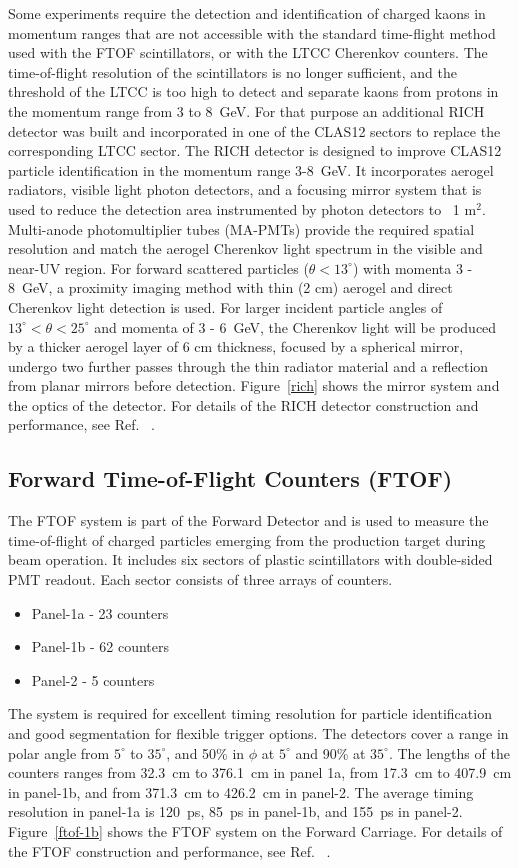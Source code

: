 \documentclass[final,3p,twocolumn]{elsarticle}
\begin{document}
Some experiments require the detection and identification of charged kaons in momentum ranges that are not 
accessible with the standard time-flight method used with the FTOF scintillators, or with the LTCC Cherenkov counters.
The time-of-flight resolution of the scintillators is no longer sufficient, and the threshold of the LTCC is too high 
to detect and separate kaons from protons in the momentum range from 3 to 8~GeV. For that purpose an additional
RICH detector was built and incorporated in one of the CLAS12 sectors to replace the corresponding LTCC sector. 
The RICH detector is designed to improve CLAS12 particle identification in the momentum range 3-8~GeV. It incorporates 
aerogel radiators, visible light photon detectors, and a focusing mirror system that is used to reduce the detection 
area instrumented by photon detectors to ~1 m$^2$.  Multi-anode photomultiplier tubes (MA-PMTs) provide the required 
spatial resolution and match the aerogel Cherenkov light spectrum in the visible and near-UV region.
For forward scattered particles ($\theta < 13^\circ$) with momenta 3 - 8~GeV, a proximity imaging method with thin (2 cm) 
aerogel and direct Cherenkov light detection is used. For larger incident particle angles of $13^\circ < \theta < 25^\circ$ and 
momenta of 3 - 6~GeV, the Cherenkov light will be produced by a thicker aerogel layer of 6 cm thickness, focused by a 
spherical mirror, undergo two further passes through the thin radiator material and a reflection from planar mirrors before 
detection. Figure~\ref{rich} shows the mirror system and the optics of the detector. For details of the RICH detector
construction and performance, see Ref. ~\cite{RICH}.

\subsection{Forward Time-of-Flight Counters (FTOF)}
\label{ftof}

The FTOF system is part of the Forward Detector and is used to measure the time-of-flight of charged particles 
emerging from the production target during beam operation. It includes six sectors of plastic scintillators with 
double-sided PMT readout. Each sector consists of three arrays of counters. 
\begin{itemize}
\item Panel-1a - 23 counters 
\item Panel-1b - 62 counters
\item Panel-2 - 5 counters 
\end{itemize}
The system is required for excellent timing resolution for particle identification and good segmentation for flexible
trigger options. The detectors cover a  range in polar angle from $5^\circ$ to $35^\circ$, and 50\% in $\phi$ at 
$5^\circ$ and 90\% at $35^\circ$. The lengths of the counters ranges from 32.3~cm to 376.1~cm in panel 1a, from
17.3~cm to 407.9~cm in panel-1b, and from 371.3~cm to 426.2~cm in panel-2.  The average timing resolution in panel-1a
is 120~ps, 85~ps in panel-1b, and 155~ps in panel-2. Figure~\ref{ftof-1b} shows the FTOF system on the Forward Carriage.
For details of the FTOF construction and performance, see Ref. ~\cite{FTOF}. 
\end{document}
